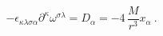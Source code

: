 \begin{equation}
-\epsilon _{\kappa \lambda \sigma \alpha }\partial ^{\kappa }\omega ^{\sigma
\lambda }=D_{\alpha }=-4\,\frac{M}{r^{3}}x_{\alpha }\ .  \label{cat}
\end{equation}%
